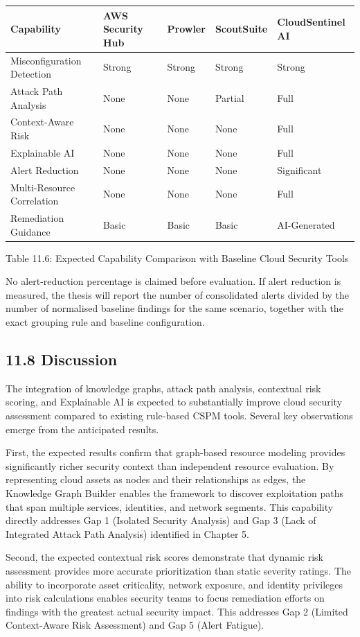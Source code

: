 \begin{longtable}[]{@{}lllll@{}}
\toprule\noalign{}
Capability & AWS Security Hub & Prowler & ScoutSuite & CloudSentinel AI \\
\midrule\noalign{}
\endhead
\bottomrule\noalign{}
\endlastfoot
Misconfiguration Detection & Strong & Strong & Strong & Strong \\
Attack Path Analysis & None & None & Partial & Full \\
Context-Aware Risk & None & None & None & Full \\
Explainable AI & None & None & None & Full \\
Alert Reduction & None & None & None & Significant \\
Multi-Resource Correlation & None & None & None & Full \\
Remediation Guidance & Basic & Basic & Basic & AI-Generated \\
\end{longtable}

Table 11.6: Expected Capability Comparison with Baseline Cloud Security Tools

No alert-reduction percentage is claimed before evaluation. If alert reduction is measured, the thesis will report the number of consolidated alerts divided by the number of normalised baseline findings for the same scenario, together with the exact grouping rule and baseline configuration.

\subsection{11.8 Discussion}

The integration of knowledge graphs, attack path analysis, contextual risk scoring, and Explainable AI is expected to substantially improve cloud security assessment compared to existing rule-based CSPM tools. Several key observations emerge from the anticipated results.

First, the expected results confirm that graph-based resource modeling provides significantly richer security context than independent resource evaluation. By representing cloud assets as nodes and their relationships as edges, the Knowledge Graph Builder enables the framework to discover exploitation paths that span multiple services, identities, and network segments. This capability directly addresses Gap 1 (Isolated Security Analysis) and Gap 3 (Lack of Integrated Attack Path Analysis) identified in Chapter 5.

Second, the expected contextual risk scores demonstrate that dynamic risk assessment provides more accurate prioritization than static severity ratings. The ability to incorporate asset criticality, network exposure, and identity privileges into risk calculations enables security teams to focus remediation efforts on findings with the greatest actual security impact. This addresses Gap 2 (Limited Context-Aware Risk Assessment) and Gap 5 (Alert Fatigue).

